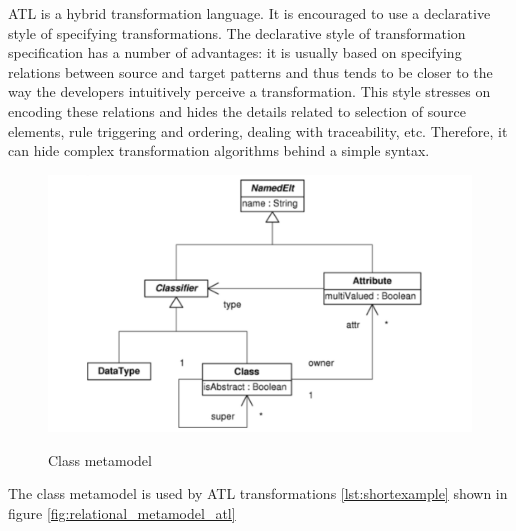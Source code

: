 \documentclass{llncs}
\begin{document}
ATL is a hybrid transformation language. It is encouraged to use a declarative style of specifying transformations. The declarative style of transformation specification has a number of advantages: it is usually based on specifying relations between source and target patterns and thus tends to be closer to the way the developers intuitively perceive a transformation. This style stresses on encoding these relations and hides the details related to selection of source elements, rule triggering and ordering, dealing with traceability, etc. Therefore, it can hide complex transformation algorithms behind a simple syntax.\cite{atl:frederic}

\begin{figure}
	\centering
	\includegraphics[width=1\textwidth,natwidth=610,natheight=642]{figures/Class_metamodel.pdf}
	\caption{Class metamodel}\cite{atl:frederic}
	\label{fig:class_metamodel_atl}
\end{figure}

The class metamodel is used by ATL transformations \ref{lst:shortexample}
shown in figure \ref{fig:relational_metamodel_atl}\cite{atl:frederic}
\end{document}
